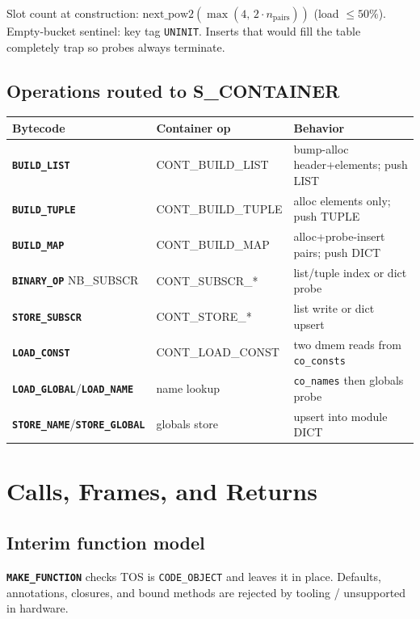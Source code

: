 \documentclass[11pt,a4paper]{article}
\newcommand{\opcode}[1]{\texttt{\textbf{#1}}}
\newcommand{\tagname}[1]{\texttt{#1}}
\begin{document}
Slot count at construction: $\mathrm{next\_pow2}(\max(4,\,2\cdot n_{\mathrm{pairs}}))$
(load $\le 50\%$). Empty-bucket sentinel: key tag \tagname{UNINIT}. Inserts that
would fill the table completely trap so probes always terminate.

\subsection{Operations routed to S\_CONTAINER}

\begin{center}
\begin{tabular}{@{}llp{6.8cm}@{}}
\toprule
\textbf{Bytecode} & \textbf{Container op} & \textbf{Behavior} \\
\midrule
\opcode{BUILD\_LIST} & CONT\_BUILD\_LIST & bump-alloc header+elements; push LIST \\
\opcode{BUILD\_TUPLE} & CONT\_BUILD\_TUPLE & alloc elements only; push TUPLE \\
\opcode{BUILD\_MAP} & CONT\_BUILD\_MAP & alloc+probe-insert pairs; push DICT \\
\opcode{BINARY\_OP} NB\_SUBSCR & CONT\_SUBSCR\_* & list/tuple index or dict probe \\
\opcode{STORE\_SUBSCR} & CONT\_STORE\_* & list write or dict upsert \\
\opcode{LOAD\_CONST} & CONT\_LOAD\_CONST & two dmem reads from \texttt{co\_consts} \\
\opcode{LOAD\_GLOBAL}/\opcode{LOAD\_NAME} & name lookup & \texttt{co\_names} then globals probe \\
\opcode{STORE\_NAME}/\opcode{STORE\_GLOBAL} & globals store & upsert into module DICT \\
\bottomrule
\end{tabular}
\end{center}

\section{Calls, Frames, and Returns}
\label{sec:calls}

\subsection{Interim function model}

\begin{specbox}
\opcode{MAKE\_FUNCTION} checks TOS is \tagname{CODE\_OBJECT} and leaves it in
place. Defaults, annotations, closures, and bound methods are rejected by
tooling / unsupported in hardware.
\end{specbox}
\end{document}
